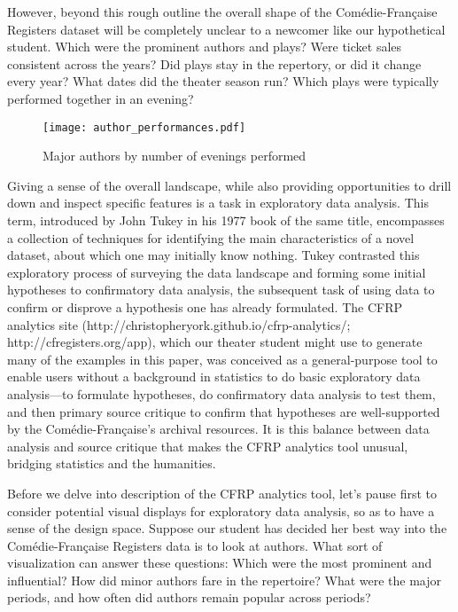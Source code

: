 \documentclass[	DIV=calc,%
							paper=a4,%
							fontsize=11pt,%
							twocolumn]{scrartcl}	 					%
\begin{document}
However, beyond this rough outline the overall shape of the Comédie-Française Registers dataset will be completely unclear to a newcomer like our hypothetical student.  Which were the prominent authors and plays? Were ticket sales consistent across the years?  Did plays stay in the repertory, or did it change every year?  What dates did the theater season run?  Which plays were typically performed together in an evening?

\begin{figure}
  \centering
  \texttt{[image: author\_performances.pdf]}
	\caption{Major authors by number of evenings performed}
  \label{fig:tukey_boxplot}
\end{figure}

Giving a sense of the overall landscape, while also providing opportunities to drill down and inspect specific features is a task in exploratory data analysis. This term, introduced by John Tukey in his 1977 book of the same title, encompasses a collection of techniques for identifying the main characteristics of a novel dataset, about which one may initially know nothing.  Tukey contrasted this exploratory process of surveying the data landscape and forming some initial hypotheses to confirmatory data analysis, the subsequent task of using data to confirm or disprove a hypothesis one has already formulated.\cite{TUKEY:1977}  The CFRP analytics site (http://christopheryork.github.io/cfrp-analytics/; http://cfregisters.org/app), which our theater student might use to generate many of the examples in this paper, was conceived as a general-purpose tool to enable users without a background in statistics to do basic exploratory data analysis—to formulate hypotheses, do confirmatory data analysis to test them, and then primary source critique to confirm that hypotheses are well-supported by the Comédie-Française’s archival resources.  It is this balance between data analysis and source critique that makes the CFRP analytics tool unusual, bridging statistics and the humanities.

Before we delve into description of the CFRP analytics tool, let’s pause first to consider potential visual displays for exploratory data analysis, so as to have a sense of the design space. Suppose our student has decided her best way into the Comédie-Française Registers data is to look at authors.  What sort of visualization can answer these questions: Which were the most prominent and influential?  How did minor authors fare in the repertoire?  What were the major periods, and how often did authors remain popular across periods?
\end{document}
